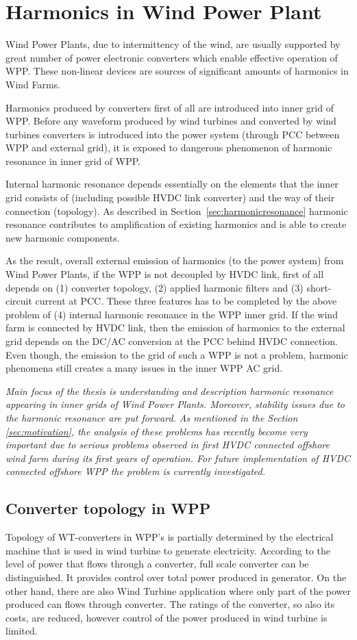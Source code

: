 \documentclass[12pt]{report} %
\begin{document}
\section{Harmonics in Wind Power Plant} \label{sec:harmonicsinwpp}
Wind Power Plants, due to intermittency of the wind, are usually supported by great number of power electronic converters which enable effective operation of WPP. These non-linear devices are sources of significant amounts of harmonics in Wind Farms. 

Harmonics produced by converters first of all are introduced into inner grid of WPP. Before any waveform produced by wind turbines and converted by wind turbines converters is introduced into the power system (through PCC between WPP and external grid), it is exposed to dangerous phenomenon of harmonic resonance in inner grid of WPP. 

Internal harmonic resonance depends essentially on the elements that the inner grid consists of (including possible HVDC link converter) and the way of their connection (topology). As described in Section~\ref{sec:harmonicresonance} harmonic resonance contributes to amplification of existing harmonics and is able to create new harmonic components.

As the result, overall external emission of harmonics (to the power system) from Wind Power Plants, if the WPP is not decoupled by HVDC link, first of all depends on \cite{das} (1) converter topology, (2) applied harmonic filters and (3) short-circuit current at PCC. These three features has to be completed by the above problem of (4) internal harmonic resonance in the WPP inner grid. If the wind farm is connected by HVDC link, then the emission of harmonics to the external grid depends on the DC/AC conversion at the PCC behind HVDC connection. Even though, the emission to the grid of such a WPP is not a problem, harmonic phenomena still creates a many issues in the inner WPP AC grid.

\textit{Main focus of the thesis is understanding and description harmonic resonance appearing in inner grids of Wind Power Plants. Moreover, stability issues due to the harmonic resonance are put forward. As mentioned in the Section \ref{sec:motivation}, the analysis of these problems has recently become very important due to serious problems observed in first HVDC connected offshore wind farm during its first years of operation. For future implementation of HVDC connected offshore WPP the problem is currently investigated.}

\subsection{Converter topology in WPP}
Topology of WT-converters in WPP's is partially determined by the electrical machine that is used in wind turbine to generate electricity. According to the level of power that flows through a converter, full scale converter can be distinguished. It provides control over total power produced in generator. On the other hand, there are also Wind Turbine application where only part of the power produced can flows through converter. The ratings of the converter, so also its costs, are reduced, however control of the power produced in wind turbine is limited. 
\end{document}
